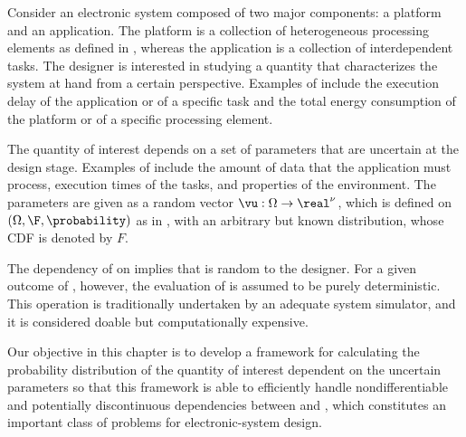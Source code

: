 Consider an electronic system composed of two major components: a platform and
an application. The platform is a collection of heterogeneous processing
elements as defined in , whereas the application is a
collection of interdependent tasks. The designer is interested in studying a
quantity \g that characterizes the system at hand from a certain perspective.
Examples of \g include the execution delay of the application or of a specific
task and the total energy consumption of the platform or of a specific
processing element.

The quantity of interest \g depends on a set of parameters \vu that are
uncertain at the design stage. Examples of \vu include the amount of data that
the application must process, execution times of the tasks, and properties of
the environment. The parameters \vu are given as a random vector $\vu: \Omega
\to \real^\nu$, which is defined on $(\Omega, \F, \probability)$ as in
, with an arbitrary but known distribution, whose
\ac{CDF} is denoted by $F$.

The dependency of \g on \vu implies that \g is random to the designer. For a
given outcome of \vu, however, the evaluation of \g is assumed to be purely
deterministic. This operation is traditionally undertaken by an adequate system
simulator, and it is considered doable but computationally expensive.

Our objective in this chapter is to develop a framework for calculating the
probability distribution of the quantity of interest \g dependent on the
uncertain parameters \vu so that this framework is able to efficiently handle
nondifferentiable and potentially discontinuous dependencies between \g and \vu,
which constitutes an important class of problems for electronic-system design.
